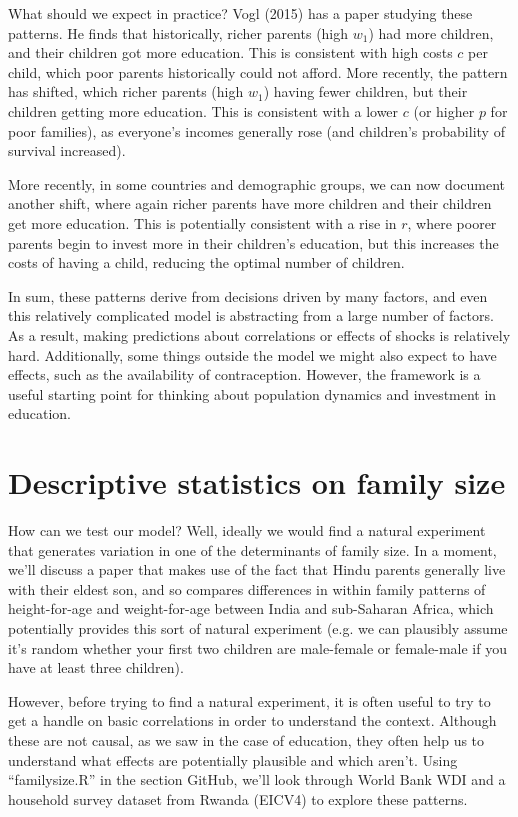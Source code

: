 \documentclass[12pt,english]{article}
\begin{document}
What should we expect in practice? Vogl (2015) has a paper studying these patterns. He finds that historically, richer parents (high $w_{1}$) had more children, and their children got more education. This is consistent with high costs $c$ per child, which poor parents historically could not afford. More recently, the pattern has shifted, which richer parents (high $w_{1}$) having fewer children, but their children getting more education. This is consistent with a lower $c$ (or higher $p$ for poor families), as everyone's incomes generally rose (and children's probability of survival increased).

More recently, in some countries and demographic groups, we can now document another shift, where again richer parents have more children and their children get more education. This is potentially consistent with a rise in $r$, where poorer parents begin to invest more in their children's education, but this increases the costs of having a child, reducing the optimal number of children.

In sum, these patterns derive from decisions driven by many factors, and even this relatively complicated model is abstracting from a large number of factors. As a result, making predictions about correlations or effects of shocks is relatively hard. Additionally, some things outside the model we might also expect to have effects, such as the availability of contraception. However, the framework is a useful starting point for thinking about population dynamics and investment in education.

\section{Descriptive statistics on family size}

How can we test our model? Well, ideally we would find a natural experiment that generates variation in one of the determinants of family size. In a moment, we'll discuss a paper that makes use of the fact that Hindu parents generally live with their eldest son, and so compares differences in within family patterns of height-for-age and weight-for-age between India and sub-Saharan Africa, which potentially provides this sort of natural experiment (e.g. we can plausibly assume it's random whether your first two children are male-female or female-male if you have at least three children).

However, before trying to find a natural experiment, it is often useful to try to get a handle on basic correlations in order to understand the context. Although these are not causal, as we saw in the case of education, they often help us to understand what effects are potentially plausible and which aren't. Using ``familysize.R'' in the section GitHub, we'll look through World Bank WDI and a household survey dataset from Rwanda (EICV4) to explore these patterns.
\end{document}
